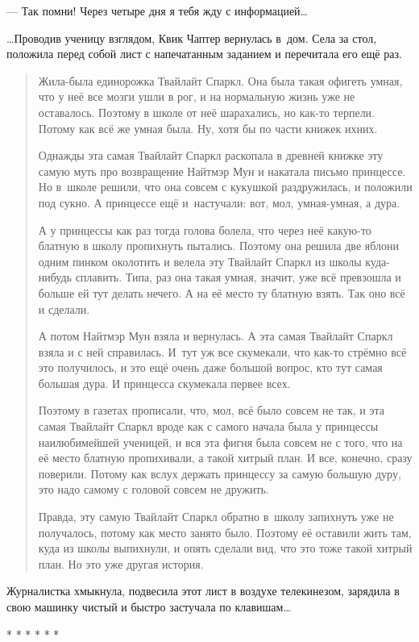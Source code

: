 \documentclass[fontsize=11pt,a5paper,titlepage=firstcover]{scrbook}
\begin{document}
--- Так помни! Через четыре дня я тебя жду с информацией{\ldots}

{\ldots}Проводив ученицу взглядом, Квик Чаптер вернулась в~дом. Села за стол, положила перед собой лист с напечатанным заданием и перечитала его ещё раз.
\begin{quotation}
Жила-была единорожка Твайлайт Спаркл. Она была такая офигеть умная, что у неё все мозги ушли в рог, и на нормальную жизнь уже не оставалось. Поэтому в школе от неё шарахались, но как-то терпели. Потому как всё же умная была. Ну, хотя бы по части книжек ихних.

Однажды эта самая Твайлайт Спаркл раскопала в древней книжке эту самую муть про возвращение Найтмэр Мун и накатала письмо принцессе. Но в~школе решили, что она совсем с кукушкой раздружилась, и положили под сукно. А принцессе ещё и~настучали: вот, мол, умная-умная, а дура.

А у принцессы как раз тогда голова болела, что через неё какую-то блатную в школу пропихнуть пытались. Поэтому она решила две яблони одним пинком околотить и велела эту Твайлайт Спаркл из школы куда-нибудь сплавить. Типа, раз она такая умная, значит, уже всё превзошла и больше ей тут делать нечего. А на её место ту блатную взять. Так оно всё и сделали.

А потом Найтмэр Мун взяла и вернулась. А эта самая Твайлайт Спаркл взяла и с ней справилась. И~тут уж все скумекали, что как-то стрёмно всё это получилось, и это ещё очень даже большой вопрос, кто тут самая большая дура. И принцесса скумекала первее всех.

Поэтому в газетах прописали, что, мол, всё было совсем не так, и эта самая Твайлайт Спаркл вроде как с самого начала была у принцессы наилюбимейшей ученицей, и вся эта фигня была совсем не с того, что на её место блатную пропихивали, а такой хитрый план. И все, конечно, сразу поверили. Потому как вслух держать принцессу за самую большую дуру, это надо самому с головой совсем не дружить.

Правда, эту самую Твайлайт Спаркл обратно в~школу запихнуть уже не получалось, потому как место занято было. Поэтому её оставили жить там, куда из школы выпихнули, и опять сделали вид, что это тоже такой хитрый план. Но это уже другая история.
\end{quotation}
Журналистка хмыкнула, подвесила этот лист в воздухе телекинезом, зарядила в свою машинку чистый и быстро застучала по клавишам{\ldots}
\begin{center}* * * * * *\end{center}
\end{document}
